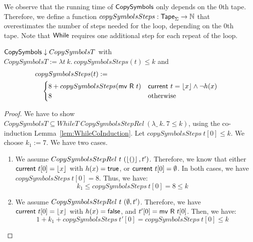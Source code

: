 We observe that the running time of $\mathsf{CopySymbols}$ only depends on the $0$th tape.  Therefore, we define a function
$copySymbolsSteps : \mathsf{Tape}_\Sigma \rightarrow \mathbb{N}$ that overestimates the number of steps needed for the loop, depending on the $0$th tape.  Note that
$\mathsf{While}$ requires one additional step for each repeat of the loop.
\begin{lemma}
  $\mathsf{CopySymbols} \mathrel{\downarrow} CopySymbolsT$ with \\
  $CopySymbolsT := \lambda t~k.~copySymbolsSteps(t) \leq k$ and
  \begin{align*}
    &copySymbolsSteps (t) := \\
    &\quad\begin{cases}
      8 + copySymbolsSteps(\mathsf{mv}~\mathsf{R}~t) & \mathsf{current}~t=\left\lfloor {x} \right\rfloor \land \lnot h(x) \\
      8                                      & \text{otherwise}
    \end{cases}
  \end{align*}
\end{lemma}
\begin{proof}
  We have to show $CopySymbolsT \subseteq WhileT~CopySymbolsStepRel~(\lambda \_~k.~7 \leq k)$, using the co-induction
  Lemma~\ref{lem:WhileCoInduction}.  Let $copySymbolsSteps~t[0] \leq k$.  We choose $k_1 := 7$.  We have two cases.
  \begin{enumerate}
  \item We assume $CopySymbolsStepRel~t~(\left\lfloor {\ensuremath{\mathsf{()}}} \right\rfloor, t')$.  Therefore, we know that either $\mathsf{current}~t[0]=\left\lfloor {x} \right\rfloor$ with $h(x)=\mathsf{true}$, or
    $\mathsf{current}~t[0]=\emptyset$.  In both cases, we have $copySymbolsSteps~t[0] = 8$.  Thus, we have:
    $$k_1 \leq copySymbolsSteps~t[0] = 8 \leq k$$
  \item We assume $CopySymbolsStepRel~t~(\emptyset, t')$.  Therefore, we have $\mathsf{current}~t[0]=\left\lfloor {x} \right\rfloor$ with $h(x)=\mathsf{false}$, and
    $t'[0]=\mathsf{mv}~\mathsf{R}~t[0]$.  Then, we have:
    \begin{equation*}
      1+k_1+copySymbolsSteps~t'[0] = copySymbolsSteps~t[0] \leq k
    \end{equation*}
  \end{enumerate}
\end{proof}

